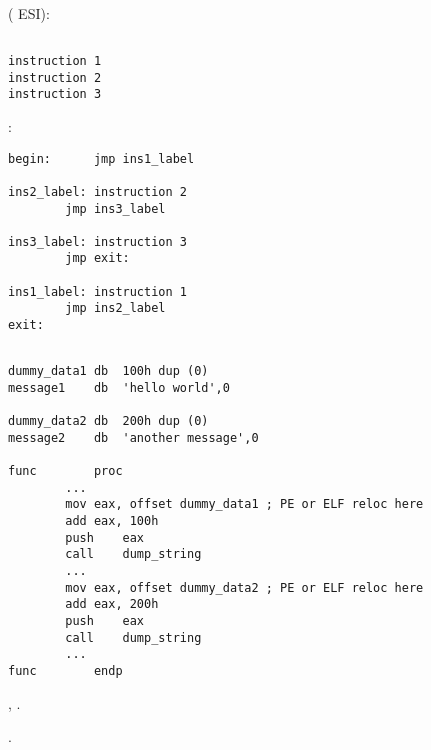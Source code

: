  (
 ESI):



\subsection{}

\begin{lstlisting}
instruction 1
instruction 2
instruction 3
\end{lstlisting}

:

\begin{lstlisting}
begin:		jmp	ins1_label

ins2_label:	instruction 2
		jmp	ins3_label

ins3_label:	instruction 3
		jmp	exit:

ins1_label:	instruction 1
		jmp	ins2_label
exit:
\end{lstlisting}

\subsection{}

\begin{lstlisting}
dummy_data1	db	100h dup (0)
message1	db	'hello world',0

dummy_data2	db	200h dup (0)
message2	db	'another message',0

func		proc
		...
		mov	eax, offset dummy_data1 ; PE or ELF reloc here
		add	eax, 100h
		push	eax
		call	dump_string
		...
		mov	eax, offset dummy_data2 ; PE or ELF reloc here
		add	eax, 200h
		push	eax
		call	dump_string
		...
func		endp
\end{lstlisting}

\IDA{}   \AndENRU {}, 
.

.

\section{}

